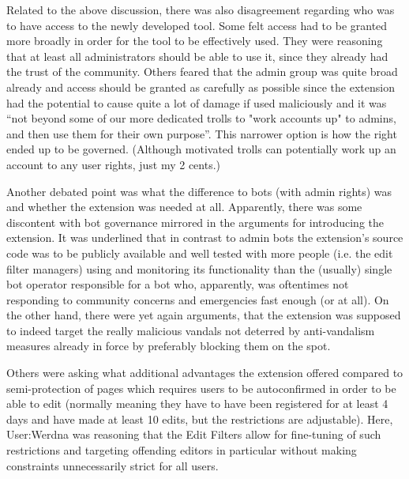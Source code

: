 Related to the above discussion, there was also disagreement regarding who was to have access to the newly developed tool.
Some felt access had to be granted more broadly in order for the tool to be effectively used.
They were reasoning that at least all administrators should be able to use it, since they already had the trust of the community.
Others feared that the admin group was quite broad already and access should be granted as carefully as possible since the extension had the potential to cause quite a lot of damage if used maliciously and it was ``not beyond some of our more dedicated trolls to "work accounts up" to admins, and then use them for their own purpose''.
This narrower option is how the right ended up to be governed.
(Although motivated trolls can potentially work up an account to any user rights, just my 2 cents.)

Another debated point was what the difference to bots (with admin rights) was and whether the extension was needed at all.
Apparently, there was some discontent with bot governance mirrored in the arguments for introducing the extension.
It was underlined that in contrast to admin bots the extension's source code was to be publicly available and well tested with more people (i.e. the edit filter managers) using and monitoring its functionality than the (usually) single bot operator responsible for a bot who, apparently, was oftentimes not responding to community concerns and emergencies fast enough (or at all).
On the other hand, there were yet again arguments, that the extension was supposed to indeed target the really malicious vandals not deterred by anti-vandalism measures already in force by preferably blocking them on the spot.

Others were asking what additional advantages the extension offered compared to semi-protection of pages which requires users to be autoconfirmed in order to be able to edit (normally meaning they have to have been registered for at least 4 days and have made at least 10 edits, but the restrictions are adjustable).
Here, User:Werdna was reasoning that the Edit Filters allow for fine-tuning of such restrictions and targeting offending editors in particular without making constraints unnecessarily strict for all users.

